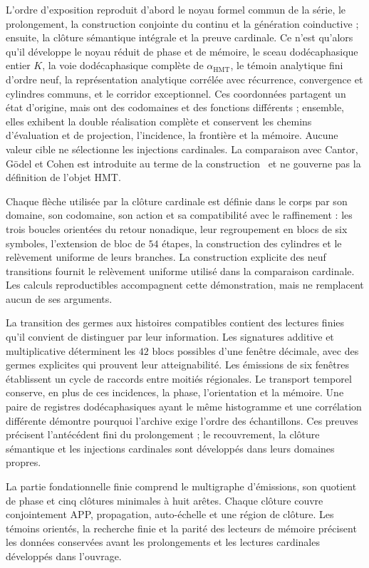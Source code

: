 L'ordre d'exposition reproduit d'abord le noyau formel commun de la série, le prolongement, la construction conjointe du continu et la génération coinductive ; ensuite, la clôture sémantique intégrale et la preuve cardinale. Ce n'est qu'alors qu'il développe le noyau réduit de phase et de mémoire, le sceau dodécaphasique entier \(K\), la voie dodécaphasique complète de \(\alpha_{\mathrm{HMT}}\), le témoin analytique fini d'ordre neuf, la représentation analytique corrélée avec récurrence, convergence et cylindres communs, et le corridor exceptionnel. Ces coordonnées partagent un état d'origine, mais ont des codomaines et des fonctions différents ; ensemble, elles exhibent la double réalisation complète et conservent les chemins d'évaluation et de projection, l'incidence, la frontière et la mémoire. Aucune valeur cible ne sélectionne les injections cardinales. La comparaison avec Cantor, Gödel et Cohen est introduite au terme de la construction~\cite{Cantor1878,Hilbert1902,Godel1938,Cohen1963,Cohen1964} et ne gouverne pas la définition de l'objet HMT.

Chaque flèche utilisée par la clôture cardinale est définie dans le corps par son
domaine, son codomaine, son action et sa compatibilité avec le raffinement : les trois boucles
orientées du retour nonadique, leur regroupement en blocs de six symboles,
l’extension de bloc de \(54\) étapes, la construction des cylindres et le
relèvement uniforme de leurs branches. La construction explicite des neuf
transitions fournit le relèvement uniforme utilisé dans la comparaison
cardinale. Les calculs reproductibles accompagnent cette démonstration, mais ne
remplacent aucun de ses arguments.

La transition des germes aux histoires compatibles contient des
lectures finies qu’il convient de distinguer par leur information. Les signatures
additive et multiplicative déterminent les \(42\) blocs possibles d’une
fenêtre décimale, avec des germes explicites qui prouvent leur atteignabilité.
Les émissions de six fenêtres établissent un cycle de raccords entre
moitiés régionales. Le transport temporel conserve, en plus de ces
incidences, la phase, l’orientation et la mémoire. Une paire de registres dodécaphasiques
ayant le même histogramme et une corrélation différente démontre pourquoi
l’archive exige l’ordre des échantillons. Ces preuves précisent
l’antécédent fini du prolongement ; le recouvrement, la clôture sémantique
et les injections cardinales sont développés dans leurs domaines propres.

La partie fondationnelle finie comprend le multigraphe d’émissions, son
quotient de phase et cinq clôtures minimales à huit arêtes. Chaque clôture
couvre conjointement APP, propagation, auto-échelle et une région de clôture.
Les témoins orientés, la recherche finie et la parité des lecteurs
de mémoire précisent les données conservées avant les prolongements
et les lectures cardinales développés dans l’ouvrage.
